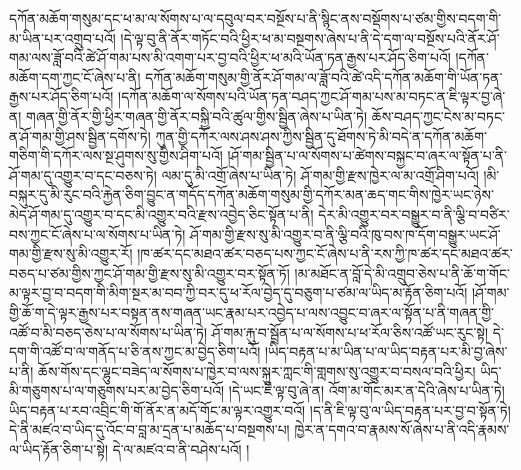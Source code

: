 དཀོན་མཆོག་གསུམ་དང་ཕ་མ་ལ་སོགས་པ་ལ་དབུལ་བར་བསྔོས་པ་ནི་སྙིང་ནས་བསྡོགས་པ་ཙམ་གྱིས་བདག་གི་མ་ཡིན་པར་འགྲུབ་པའོ། །དེ་ལྟ་བུ་ནི་ནོར་གཏོང་བའི་ཕྱིར་ཕ་མ་བསྔགས་ཞེས་པ་ནི་དེ་དག་ལ་བསྔོས་པའི་ནོར་ཤོ་གམ་ལས་ཟློ་བའི་ཚེ་ཤོ་གམ་པས་མི་འགག་པར་བྱ་བའི་ཕྱིར་ཕ་མའི་ཡོན་ཏན་རྒྱས་པར་ཤོད་ཅིག་པའོ། །དཀོན་མཆོག་དག་ཀྱང་ངོ་ཞེས་པ་ནི། དཀོན་མཆོག་གསུམ་གྱི་ནོར་ཤོ་གམ་ལ་ཟློ་བའི་ཚེ་འདི་དཀོན་མཆོག་གི་ཡོན་ཏན་རྒྱས་པར་ཤོད་ཅིག་པའོ། །དཀོན་མཆོག་ལ་སོགས་པའི་ཡོན་ཏན་བཤད་ཀྱང་ཤོ་གམ་པས་མ་བཏང་ན་ཇི་ལྟར་བྱ་ཞེ་ན། གཞན་གྱི་ནོར་གྱི་ཕྱིར་གཞན་གྱི་ནོར་བསྐྱི་བའི་ཚུལ་གྱིས་སྦྱིན་ཞེས་པ་ཡིན་ཏེ། ཆོས་བཤད་ཀྱང་ངེས་མ་བཏང་ན་ཤོ་གམ་གྱི་ཤས་སྦྱིན་དགོས་ཏེ། ཀུན་གྱི་དཀོར་ལས་ཤས་ཤས་ཀྱིས་སྦྱིན་དུ་ཐོགས་ཏེ་མི་བདེ་ན་དཀོན་མཆོག་གཅིག་གི་དཀོར་ལས་སྔ་ཤུགས་སུ་གྱིས་ཤིག་པའོ། །ཤོ་གམ་སྦྱིན་པ་ལ་སོགས་པ་ཚེགས་བསྐྱང་བ་ཞར་ལ་སྟོན་པ་ནི་ཤོ་གམ་དུ་འགྱུར་བ་དང་བཅས་ཏེ། ལམ་དུ་མི་འགྲོ་ཞེས་པ་ཡིན་ཏེ། ཤོ་གམ་གྱི་རྫས་ཁྱེར་ལ་མ་འགྲོ་ཤིག་པའོ། །མི་བསྐུར་དུ་མི་རུང་བའི་རྐྱེན་ཅིག་བྱུང་ན་གདོད་དཀོན་མཆོག་གསུམ་གྱི་དཀོར་མན་ཆད་གང་གིས་ཁྱེར་ཡང་ཉེས་མེད་ཤོ་གམ་དུ་འགྱུར་བ་དང་མི་འགྱུར་བའི་རྫས་འབྱེད་ཅིང་སྟོན་པ་ནི། དེར་མི་འགྱུར་བར་བསྒྱུར་བ་ནི་ལྕི་བ་བཙིར་བས་ཀྱང་ངོ་ཞེས་པ་ལ་སོགས་པ་ཡིན་ཏེ། ཤོ་གམ་གྱི་རྫས་སུ་མི་འགྱུར་བ་ནི་ལྕི་བའི་ཁུ་བས་ཁ་དོག་བསྒྱུར་ཡང་ཤོ་གམ་གྱི་རྫས་སུ་མི་འགྱུར་རོ། །ཁ་ཚར་དང་མཐའ་ཚར་བཅད་པས་ཀྱང་ངོ་ཞེས་པ་ནི་རས་ཀྱི་ཁ་ཚར་དང་མཐའ་ཚར་བཅད་པ་ཙམ་གྱིས་ཀྱང་ཤོ་གམ་གྱི་རྫས་སུ་མི་འགྱུར་བར་སྟོན་ཏོ། །མ་མཐོང་ན་བློ་དེ་མི་འགྲུབ་ཅེས་པ་ནི་ཆོ་ག་གོང་མ་ལྟར་བྱ་བ་བདག་གི་མིག་སྔར་མ་བབ་ཀྱི་བར་དུ་ཕ་རོལ་བྱེད་དུ་བཅུག་པ་ཙམ་ལ་ཡིད་མ་རྟོན་ཅིག་པའོ། །ཤོ་གམ་གྱི་ཆོ་ག་དེ་ལྟར་རྒྱས་པར་བསྟན་ནས་གཞན་ཡང་རྣམ་པར་འབྱེད་པ་ལས་འབྱུང་བ་ཞར་ལ་སྟོན་པ་ནི་གཞན་གྱི་འཚོ་བ་མི་བཅད་ཅེས་པ་ལ་སོགས་པ་ཡིན་ཏེ། ཤོ་གམ་རྐུ་བ་སྦྲོན་པ་ལ་སོགས་པ་ཕ་རོལ་ཅིས་འཚོ་ཡང་རུང་སྟེ། དེ་དག་གི་འཚོ་བ་ལ་གནོད་པ་ཅི་ནས་ཀྱང་མ་བྱེད་ཅིག་པའོ། །ཡིད་བརྟན་པ་མ་ཡིན་པ་ལ་ཡིད་བརྟན་པར་མི་བྱ་ཞེས་པ་ནི། ཆོས་གོས་དང་ལྷུང་བཟེད་ལ་སོགས་པ་ཁྱེར་བ་ལས་སྐུར་ཀླང་གི་གླགས་སུ་འགྱུར་བ་བསལ་བའི་ཕྱིར། ཡིད་མི་གཅུགས་པ་ལ་གཅུགས་པར་མ་བྱེད་ཅིག་པའོ། །དེ་ཡང་ཇི་ལྟ་བུ་ཞེ་ན། འོག་མ་གོང་མར་ན་དེའི་ཞེས་པ་ཡིན་ཏེ། ཡིད་བརྟན་པ་རབ་འབྲིང་གི་གོ་ནོར་ན་མདོ་གོང་མ་ལྟར་འགྱུར་བའོ། །ད་ནི་ཇི་ལྟ་བུ་ལ་ཡིད་བརྟན་པར་བྱ་བ་སྟོན་ཏེ། དེ་ནི་མཛའ་བ་ཡིད་དུ་འོང་བ་བླ་མ་དྲན་པ་མཆོད་པ་བསྔགས་པ། ཁྱེར་ན་དགའ་བ་རྣམས་སོ་ཞེས་པ་ནི་འདི་རྣམས་ལ་ཡིད་རྟོན་ཅིག་པ་སྟེ། དེ་ལ་མཛའ་བ་ནི་བཤེས་པའོ། །
